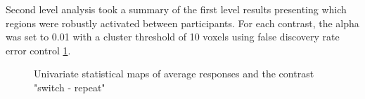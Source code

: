 \documentclass[10pt,letterpaper]{article}
\begin{document}
Second level analysis took a summary of the first level results presenting which
regions were robustly activated between participants.
For each contrast, the alpha was set to 0.01 with a cluster threshold of 10 voxels using
false discovery rate error control \ref{fig:stat_maps}.

\begin{figure}[H]
  \centering
\end{figure}

\begin{figure}[H]
  \ContinuedFloat
  \centering
\end{figure}

\begin{figure}[H]
  \ContinuedFloat
  \centering
\end{figure}

\begin{figure}[H]
  \ContinuedFloat
  \centering
  \caption{Univariate statistical maps of average responses and the contrast "switch - repeat"}
  \label{fig:stat_maps}
\end{figure}
\end{document}
